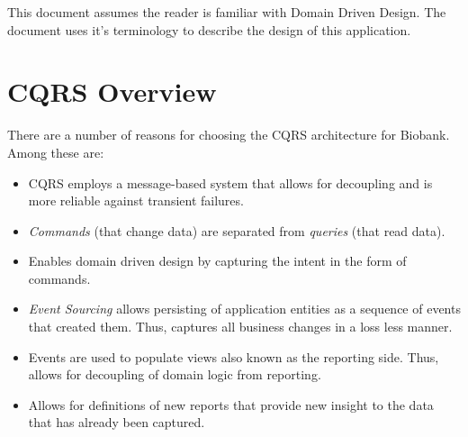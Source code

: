 This document assumes the reader is familiar with Domain Driven Design. The
document uses it's terminology to describe the design of this application.

\section{CQRS Overview}

There are a number of reasons for choosing the CQRS architecture for
Biobank. Among these are:

\begin{itemize}
\item CQRS employs a message-based system that allows for decoupling and is more
  reliable against transient failures.
\item \emph{Commands} (that change data) are separated from \emph{queries}
  (that read data).
\item Enables domain driven design by capturing the intent in the form of
  commands.
\item \emph{Event Sourcing} allows persisting of application entities as a
  sequence of events that created them. Thus, captures all business changes in a
  loss less manner.
\item Events are used to populate views also known as the reporting side. Thus,
  allows for decoupling of domain logic from reporting.
\item Allows for definitions of new reports that provide new insight to the
  data that has already been captured.
\end{itemize}


